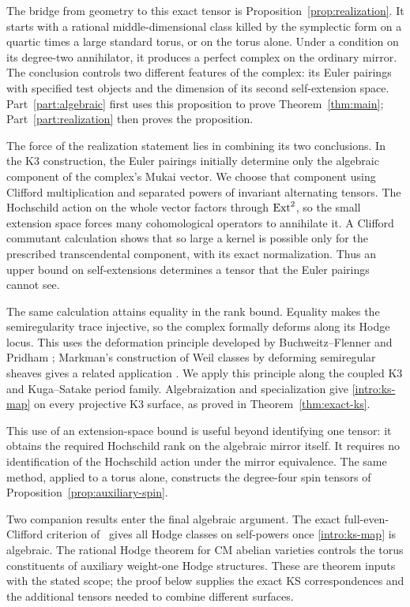 The bridge from geometry to this exact tensor is
Proposition~\ref{prop:realization}.  It starts with a rational
middle-dimensional class killed by the symplectic form on a quartic
times a large standard torus, or on the torus alone.  Under a condition
on its degree-two annihilator, it produces a perfect complex on the
ordinary mirror.
The conclusion controls two different features of the complex:
its Euler pairings with specified test objects and the dimension of
its second self-extension space.  Part~\ref{part:algebraic} first
uses this proposition to prove Theorem~\ref{thm:main};
Part~\ref{part:realization} then proves the proposition.

The force of the realization statement lies in combining its two
conclusions.  In the K3 construction, the Euler pairings initially
determine only the algebraic component of the complex's Mukai vector.
We choose that component
using Clifford multiplication and separated powers of invariant
alternating tensors.  The Hochschild action on the whole vector
factors through \(\operatorname{Ext}^2\), so the small extension space forces
many cohomological operators to annihilate it.  A Clifford commutant
calculation shows that so large a kernel is possible only for the
prescribed transcendental component, with its exact normalization.
Thus an upper bound on self-extensions determines a tensor that the
Euler pairings cannot see.

The same calculation attains equality in the rank bound.  Equality
makes the semiregularity trace injective, so the complex formally
deforms along its Hodge locus.  This uses the deformation
principle developed by
Buchweitz--Flenner and Pridham
\cite{BuchweitzFlennerSemiregularity,PridhamSemiregularity};
Markman's construction of Weil classes by deforming semiregular
sheaves gives a related application
\cite[Sections~7--9]{MarkmanSecant}.  We apply this principle along
the coupled K3 and Kuga--Satake period family.  Algebraization and
specialization give \eqref{intro:ks-map} on every projective K3
surface, as proved in
Theorem~\ref{thm:exact-ks}.

This use of an extension-space bound is useful beyond identifying
one tensor: it obtains the required Hochschild rank on the algebraic
mirror itself.  It requires no identification of the Hochschild
action under the mirror equivalence.  The same method, applied to a
torus alone, constructs the degree-four spin tensors of
Proposition~\ref{prop:auxiliary-spin}.

Two companion results enter the final algebraic argument.  The exact
full-even-Clifford criterion of~\cite[Theorem~1.1]{AKS} gives all
Hodge classes on self-powers once \eqref{intro:ks-map} is algebraic.
The rational Hodge theorem for CM abelian varieties
\cite[Theorem~1.1]{CM} controls the torus constituents of auxiliary
weight-one Hodge structures.  These are theorem inputs with the stated
scope; the proof below supplies the exact KS correspondences and the
additional tensors needed to combine different surfaces.

